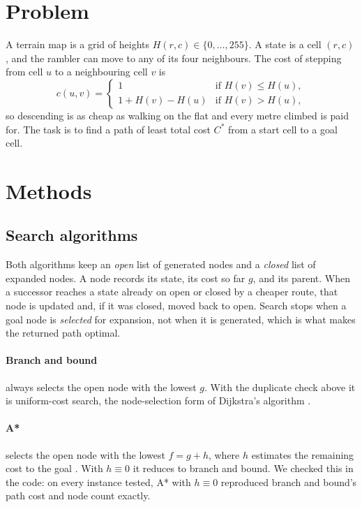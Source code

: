 \documentclass[11pt]{article}
\begin{document}
\section{Problem}
A terrain map is a grid of heights $H(r,c) \in \{0,\dots,255\}$. A state is a cell $(r,c)$, and the rambler can move to any of its four neighbours. The cost of stepping from cell $u$ to a neighbouring cell $v$ is
\begin{equation}
  c(u,v) =
  \begin{cases}
    1 & \text{if } H(v) \le H(u),\\
    1 + H(v) - H(u) & \text{if } H(v) > H(u),
  \end{cases}
  \label{eq:cost}
\end{equation}
so descending is as cheap as walking on the flat and every metre climbed is paid for. The task is to find a path of least total cost $C^*$ from a start cell to a goal cell.

\section{Methods}

\subsection{Search algorithms}
Both algorithms keep an \emph{open} list of generated nodes and a \emph{closed} list of expanded nodes. A node records its state, its cost so far $g$, and its parent. When a successor reaches a state already on open or closed by a cheaper route, that node is updated and, if it was closed, moved back to open. Search stops when a goal node is \emph{selected} for expansion, not when it is generated, which is what makes the returned path optimal.

\paragraph{Branch and bound} always selects the open node with the lowest $g$. With the duplicate check above it is uniform-cost search, the node-selection form of Dijkstra's algorithm \citep{dijkstra1959note,russell2020aima}.

\paragraph{A*} selects the open node with the lowest $f = g + h$, where $h$ estimates the remaining cost to the goal \citep{hart1968formal}. With $h \equiv 0$ it reduces to branch and bound. We checked this in the code: on every instance tested, A* with $h \equiv 0$ reproduced branch and bound's path cost and node count exactly.
\end{document}
